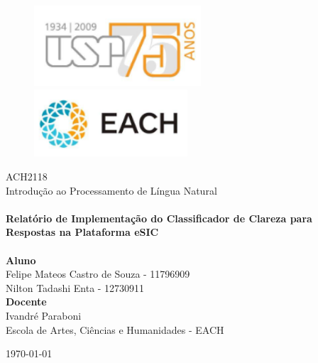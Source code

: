 \begin{titlepage}
\begin{center}


\begin{figure}[ht]
		\includegraphics[height=3cm]{images/usp_75.png}
		\hspace{3.5cm}
    	\includegraphics[height=2.5cm]{images/each.png}
	\end{figure}   


\textsc{\large ACH2118} \\
\small Introdução ao Processamento de Língua Natural\\[2cm]

\HRule \\[0.4cm]
{\large \bfseries Relatório de Implementação do Classificador de Clareza para Respostas na Plataforma eSIC \\[0.4cm]}
\HRule 
\\[2cm]

\large\textbf{Aluno}\\
Felipe Mateos Castro de Souza - 11796909\\[1cm]
Nilton Tadashi Enta - 12730911\\[1cm]

\large\textbf{Docente}\\
Ivandré Paraboni\\
Escola de Artes, Ciências e Humanidades - EACH\\[1cm]



\vfill

{\large \today}

\end{center}
\end{titlepage}